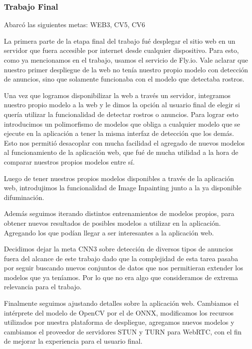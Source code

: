\documentclass[a4paper]{article}
\begin{document}
\subsubsection{Trabajo Final}

Abarcó las siguientes metas: WEB3, CV5, CV6

La primera parte de la etapa final del trabajo fué desplegar el sitio web en un servidor que fuera accesible por internet desde cualquier dispositivo. Para esto, como ya mencionamos en el trabajo, usamos el servicio de Fly.io. Vale aclarar que nuestro primer despliegue de la web no tenía nuestro propio modelo con detección de anuncios, sino que solamente funcionaba con el modelo que detectaba rostros.

Una vez que logramos disponibilizar la web a través un servidor, integramos nuestro propio modelo a la web y le dimos la opción al usuario final de elegir si quería utilizar la funcionalidad de detectar rostros o anuncios.
Para lograr esto introducimos un polimorfismo de modelos que obliga a cualquier modelo que se ejecute en la aplicación a tener la misma interfaz de detección que los demás. Esto nos permitió desacoplar con mucha facilidad el agregado de nuevos modelos al funcionamiento de la aplicación web, que fué de mucha utilidad a la hora de comparar nuestros propios modelos entre sí.

Luego de tener nuestros propios modelos disponibles a través de la aplicación web, introdujimos la funcionalidad de Image Inpainting junto a la ya disponible difuminación.

Además seguimos iterando distintos entrenamientos de modelos propios, para obtener nuevos resultados de posibles modelos a utilizar en la aplicación. Agregando los que podían llegar a ser interesantes a la aplicación web.

Decidimos dejar la meta CNN3 sobre detección de diversos tipos de anuncios fuera del alcance de este trabajo dado que la complejidad de esta tarea pasaba por seguir buscando nuevos conjuntos de datos que nos permitieran extender los modelos que ya teníamos. Por lo que no era algo que consideramos de extrema relevancia para el trabajo.

Finalmente seguimos ajustando detalles sobre la aplicación web. Cambiamos el intérprete del modelo de OpenCV por el de ONNX, modificamos los recursos utilizados por nuestra plataforma de despliegue, agregamos nuevos modelos y cambiamos el proveedor de servidores STUN y TURN para WebRTC, con el fin de mejorar la experiencia para el usuario final.
\end{document}
